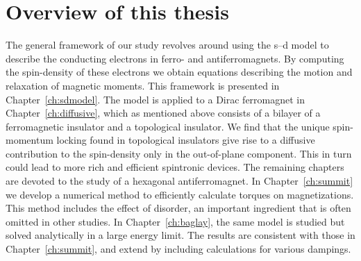\section{Overview of this thesis}
The general framework of our study revolves around using the s--d model to describe the conducting electrons in ferro- and antiferromagnets. By computing the spin-density of these electrons we obtain equations describing the motion and relaxation of magnetic moments. This framework is presented in Chapter~\ref{ch:sdmodel}. The model is applied to a Dirac ferromagnet in Chapter~\ref{ch:diffusive}, which as mentioned above consists of a bilayer of a ferromagnetic insulator and a topological insulator. We find that the unique spin-momentum locking found in topological insulators give rise to a diffusive contribution to the spin-density only in the out-of-plane component. This in turn could lead to more rich and efficient spintronic devices. The remaining chapters are devoted to the study of a hexagonal antiferromagnet. In Chapter~\ref{ch:summit} we develop a numerical method to efficiently calculate torques on magnetizations. This method includes the effect of disorder, an important ingredient that is often omitted in other studies. In Chapter~\ref{ch:baglay}, the same model is studied but solved analytically in a large energy limit. The results are consistent with those in Chapter~\ref{ch:summit}, and extend by including calculations for various dampings. 







